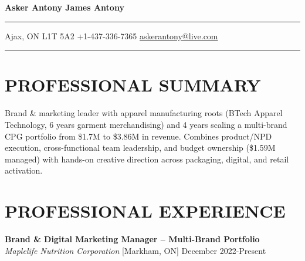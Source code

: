 \documentclass[10pt,letterpaper]{article}
\newcommand{\jobheader}[3]{\textit{#1} \hfill #2 \hfill #3}
\begin{document}
\begin{center}
    {\LARGE\textbf{Asker Antony James Antony}}
\end{center}
\noindent\rule{\linewidth}{0.6pt}
\begin{center}
    Ajax, ON \textbar{} L1T 5A2 \textbar{} +1-437-336-7365 \textbar{} \href{mailto:askerantony@live.com}{askerantony@live.com}
\end{center}
\noindent\rule{\linewidth}{0.6pt}
\vspace{2pt}

\section*{PROFESSIONAL SUMMARY}

Brand \& marketing leader with apparel manufacturing roots (BTech Apparel Technology, 6 years garment merchandising) and 4 years scaling a multi-brand CPG portfolio from \$1.7M to \$3.86M in revenue. Combines product/NPD execution, cross-functional team leadership, and budget ownership (\$1.59M managed) with hands-on creative direction across packaging, digital, and retail activation.

\section*{PROFESSIONAL EXPERIENCE}

\textbf{Brand \& Digital Marketing Manager – Multi-Brand Portfolio}\\
\jobheader{Maplelife Nutrition Corporation}{[Markham, ON]}{December 2022-Present}
\end{document}
